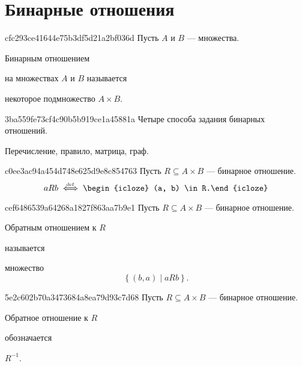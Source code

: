 \section{Бинарные отношения}
\begin{note}{cfc293ce41644e75b3df5d21a2bf036d}
    Пусть \({ A }\) и \({ B }\) --- множества.
    \begin{icloze}{2}Бинарным отношением\end{icloze} на множествах \({ A }\) и \({ B }\) называется \begin{icloze}{1}некоторое подмножество \({ A \times B }\).\end{icloze}
\end{note}

\begin{note}{3ba559fe73cf4c90b5b919ce1a45881a}
    Четыре способа задания бинарных отношений.

    \begin{cloze}{1}
        Перечисление, правило, матрица, граф.
    \end{cloze}
\end{note}

\begin{note}{c0ee3ac94a454d748e625d9e8c854763}
    Пусть \({ R \subseteq A \times B }\) --- бинарное отношение.
    \[
        aRb \overset{\hspace{-1pt}\text{\tiny def}}\iff \begin{icloze}{1}(a, b) \in R.\end{icloze}
    \]
\end{note}

\begin{note}{cef6486539a64268a1827f863aa7b9e1}
    Пусть \({ R \subseteq A \times B }\) --- бинарное отношение.
    \begin{icloze}{2}Обратным отношением к \({ R }\)\end{icloze} называется
    \begin{icloze}{1}
        множество
        \[
            \left\{ (b, a) \mid aRb \right\}.
        \]
    \end{icloze}
\end{note}

\begin{note}{5e2c602b70a3473684a8ea79d93c7d68}
    Пусть \({ R \subseteq A \times B }\) --- бинарное отношение.
    \begin{icloze}{2}Обратное отношение к \({ R }\)\end{icloze} обозначается \begin{icloze}{1}\({ R^{-1} }\).\end{icloze}
\end{note}

